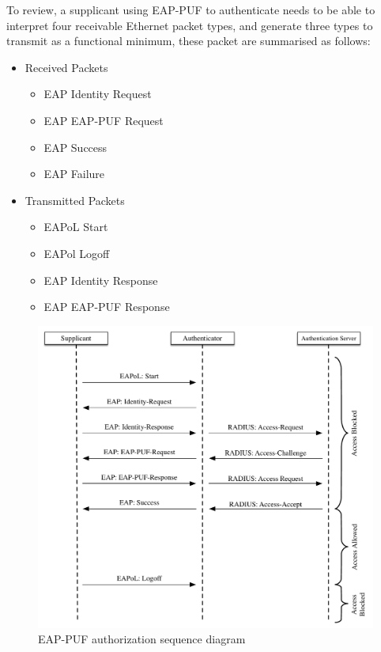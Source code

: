 To review, a supplicant using EAP-PUF to authenticate needs to be able to
interpret four receivable Ethernet packet types, and generate three types to
transmit as a functional minimum, these packet are summarised as follows:

\begin{itemize}
\item Received Packets
  \begin{itemize}
    \item EAP Identity Request
    \item EAP EAP-PUF Request
    \item EAP Success
    \item EAP Failure
  \end{itemize}
\item Transmitted Packets
  \begin{itemize}
    \item EAPoL Start
    \item EAPol Logoff
    \item EAP Identity Response
    \item EAP EAP-PUF Response
  \end{itemize}
\end{itemize}

\begin{figure}
  \centering
  \includegraphics[scale=0.5]{images/sequence}
  \caption{EAP-PUF authorization sequence diagram}
  \label{fig:sequence}
\end{figure}

